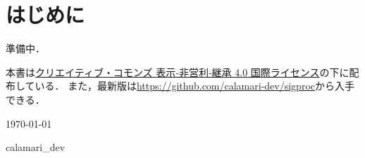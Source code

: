 \documentclass[../../main]{subfiles}
\begin{document}
\chapter{はじめに}
\thispagestyle{empty}
準備中．

本書は\href{https://creativecommons.org/licenses/by-nc-sa/4.0/deed.ja}{クリエイティブ・コモンズ 表示‐非営利‐継承 4.0 国際ライセンス}の下に配布している．
また，最新版は\url{https://github.com/calamari-dev/sigproc}から入手できる．

\vspace{1\zh}
\begin{flushleft}
  \noindent\hspace{2\zw}\today
\end{flushleft}
\begin{flushright}
  calamari\_dev\hspace*{2\zw}
\end{flushright}
\end{document}
